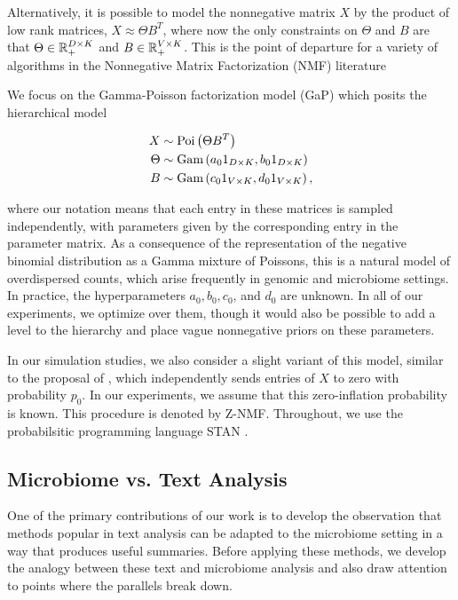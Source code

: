 \documentclass[oupdraft]{bio}
\begin{document}
Alternatively, it is possible to model the nonnegative matrix $X$ by the product
of low rank matrices, $X \approx \Theta B^{T}$, where now the only constraints
on $\Theta$ and $B$ are that $\Theta \in \mathbb{R}_{+}^{D \times K}$ and $B \in
\mathbb{R}_{+}^{V \times K}$. This is the point of departure for a variety of algorithms
in the Nonnegative Matrix Factorization (NMF) literature
\citep{wang2013nonnegative}

We focus on the Gamma-Poisson factorization model (GaP) \citep{canny2004gap}
which posits the hierarchical model

\begin{align*}
X &\sim \textnormal{Poi}\left(\Theta B^{T}\right) \\
\Theta &\sim \textnormal{Gam}\left(a_{0} 1_{D \times K}, b_{0} 1_{D \times K}\right) \\
B &\sim \textnormal{Gam}\left(c_{0} 1_{V \times K}, d_{0} 1_{V \times K} \right), 
\end{align*}

where our notation means that each entry in these matrices is sampled
independently, with parameters given by the corresponding entry in the parameter
matrix. As a consequence of the representation of the negative binomial
distribution as a Gamma mixture of Poissons, this is a natural model of
overdispersed counts, which arise frequently in genomic and microbiome settings.
In practice, the hyperparameters $a_{0}, b_{0}, c_{0}$, and $d_{0}$ are unknown.
In all of our experiments, we optimize over them, though it would also be
possible to add a level to the hierarchy and place vague nonnegative priors on
these parameters.

In our simulation studies, we also consider a slight variant of this model,
similar to the proposal of \citep{romero2014composition}, which independently
sends entries of $X$ to zero with probability $p_{0}$. In our experiments, we
assume that this zero-inflation probability is known. This procedure is denoted
by Z-NMF. Throughout, we use the probabilsitic programming language STAN
\citep{carpenter2016stan}.

\subsection{Microbiome vs. Text Analysis}
\label{sec:microbiome_vs_text_analysis}

One of the primary contributions of our work is to develop the observation that
methods popular in text analysis can be adapted to the microbiome setting in a
way that produces useful summaries. Before applying these methods, we develop
the analogy between these text and microbiome analysis and also draw attention
to points where the parallels break down.
\end{document}
